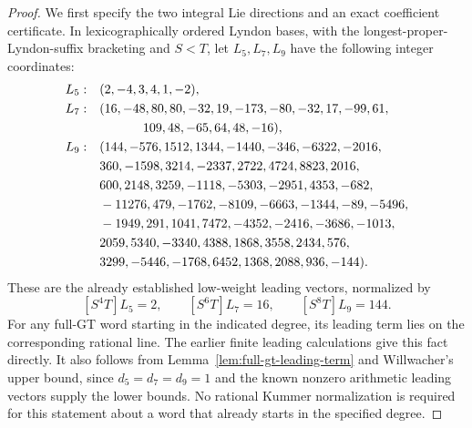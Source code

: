 \begin{proof}
We first specify the two integral Lie directions and an exact
coefficient certificate. In lexicographically ordered Lyndon
bases, with the longest-proper-Lyndon-suffix bracketing and $S<T$,
let $L_5,L_7,L_9$ have the following integer coordinates:
\begin{align*}
L_5:\quad & (2,-4,3,4,1,-2),\\
L_7:\quad & (16,-48,80,80,-32,19,-173,-80,-32,17,-99,61,\\
          &\hspace{12mm}109,48,-65,64,48,-16),\\
L_9:\quad & (144,-576,1512,1344,-1440,-346,-6322,-2016,\\
 &360,-1598,3214,-2337,2722,4724,8823,2016,\\
 &600,2148,3259,-1118,-5303,-2951,4353,-682,\\
 &-11276,479,-1762,-8109,-6663,-1344,-89,-5496,\\
 &-1949,291,1041,7472,-4352,-2416,-3686,-1013,\\
 &2059,5340,-3340,4388,1868,3558,2434,576,\\
 &3299,-5446,-1768,6452,1368,2088,936,-144).
\end{align*}
These are the already established low-weight leading vectors,
normalized by
\[
 [S^4T]L_5=2,\qquad [S^6T]L_7=16,\qquad [S^8T]L_9=144.
\]
For any full-GT word starting in the indicated degree, its leading
term lies on the corresponding rational line. The earlier finite
leading calculations give this fact directly. It also follows from
Lemma~\ref{lem:full-gt-leading-term} and Willwacher's upper bound,
since $d_5=d_7=d_9=1$ and the known nonzero arithmetic leading
vectors supply the lower bounds. No rational Kummer normalization
is required for this statement about a word that already starts
in the specified degree.


\end{proof}

